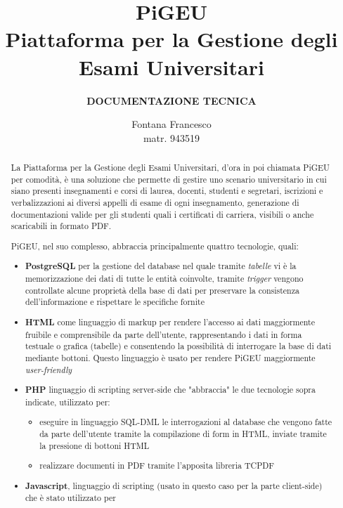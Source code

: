 \documentclass{article}
\title{PiGEU\\ Piattaforma per la Gestione degli Esami Universitari}
\author{\textbf{DOCUMENTAZIONE TECNICA}}
\date{Fontana Francesco \\ matr. 943519}
\begin{document}
    \maketitle
    \begin{abstract}

        La Piattaforma per la Gestione degli Esami Universitari, d'ora in poi chiamata PiGEU per comodità, è una soluzione che permette di gestire
        uno scenario universitario in cui siano presenti insegnamenti e corsi di laurea, docenti, studenti e segretari, iscrizioni e verbalizzazioni
        ai diversi appelli di esame di ogni insegnamento, generazione di documentazioni valide per gli studenti quali i certificati di carriera, visibili
        o anche scaricabili in formato PDF.

        PiGEU, nel suo complesso, abbraccia principalmente quattro tecnologie, quali:
        \begin{itemize}
            \item \textbf{PostgreSQL} per la gestione del database nel quale tramite \emph{tabelle} vi è la memorizzazione dei dati di tutte
            le entità coinvolte, tramite \emph{trigger} vengono controllate alcune proprietà della base di dati per preservare la consistenza dell'informazione e rispettare le specifiche fornite
            \item \textbf{HTML} come linguaggio di markup per rendere l'accesso ai dati maggiormente fruibile e comprensibile da parte dell'utente, rappresentando i dati in forma testuale o grafica (tabelle) e consentendo la possibilità di interrogare la base di dati mediante bottoni. Questo linguaggio è usato per rendere PiGEU maggiormente \emph{user-friendly}
            \item \textbf{PHP} linguaggio di scripting server-side che "abbraccia" le due tecnologie sopra indicate, utilizzato per:
            \begin{itemize}
                \item eseguire in linguaggio SQL-DML le interrogazioni al database che vengono fatte da parte dell'utente tramite la compilazione di form in HTML, inviate tramite la pressione di bottoni HTML
                \item realizzare documenti in PDF tramite l'apposita libreria TCPDF
            \end{itemize}
            \item \textbf{Javascript}, linguaggio di scripting (usato in questo caso per la parte client-side) che è stato utilizzato per
            \begin{itemize}

\end{itemize}
\end{itemize}
\end{abstract}
\end{document}
